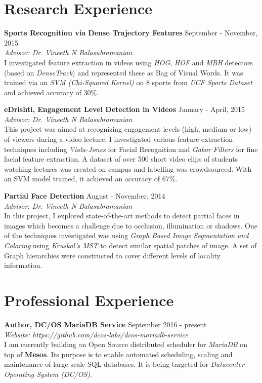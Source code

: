 \documentclass[margin,line]{res}
\begin{document}
\begin{resume}
\section{\sc Research Experience}
  {\bf Sports Recognition via Dense Trajectory Features} \hfill September - November, 2015 \\
  	{\em Advisor: Dr. Vineeth N Balasubramanian} \\
  	I investigated feature extraction in videos using {\it HOG}, {\it HOF} and {\it MBH} detectors (based on {\it DenseTrack}) and represented these as Bag of Visual Words. It was trained via an {\it SVM (Chi-Squared Kernel)} on 8 sports from {\it UCF Sports Dataset} and achieved accuracy of 30\%.

  \vspace*{-2mm}
  {\bf eDrishti, Engagement Level Detection in Videos} \hfill January - April, 2015 \\
  	{\em Advisor: Dr. Vineeth N Balasubramanian} \\
  	This project was aimed at recognizing engagement levels (high, medium or low) of viewers during a video lecture. I investigated various feature extraction techniques including {\it Viola-Jones} for Facial Recognition and {\it Gabor Filters} for fine facial feature extraction. A dataset of over 500 short video clips of students watching lectures was created on campus and labelling was crowdsourced. With an SVM model trained, it achieved an accuracy of 67\%.

  \vspace*{-2mm}
  {\bf Partial Face Detection} \hfill August - November, 2014 \\
  	{\em Advisor: Dr. Vineeth N Balasubramanian} \\
    In this project, I explored state-of-the-art methods to detect partial faces in images which becomes a challenge due to occlusion, illumination or shadows. One of the techniques investigated was using {\it Graph Based Image Segmentation and Coloring} using {\it Kruskal's MST} to detect similar spatial patches of image. A set of Graph hierarchies were constructed to cover different levels of locality information.

\section{\sc Professional Experience}
  {\bf Author, DC/OS MariaDB Service} \hfill September 2016 - present \\
    {\it Website: https://github.com/dcos-labs/dcos-mariadb-service} \\
    I am currently building an Open Source distributed scheduler for {\it MariaDB} on top of {\bf Mesos}. Its purpose is to enable automated scheduling, scaling and maintenance of large-scale SQL databases. It is being targeted for {\it Datacenter Operating System (DC/OS)}.


\end{resume}
\end{document}
